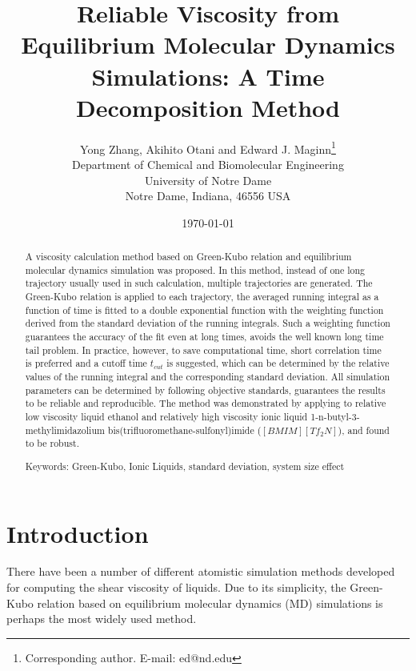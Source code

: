 \documentclass[12pt]{article}
\title{Reliable Viscosity from Equilibrium Molecular Dynamics Simulations: A Time Decomposition Method}
\author{Yong Zhang, Akihito Otani and Edward J. Maginn\thanks{Corresponding author. E-mail: ed@nd.edu} \\
                Department of Chemical and Biomolecular Engineering\\
                University of Notre Dame\\
                Notre Dame, Indiana, 46556 USA}
\date{\today}
\begin{document}

\maketitle

\newpage
\begin{abstract}

A viscosity calculation method based on Green-Kubo relation
and equilibrium molecular dynamics simulation was proposed.
In this method,
instead of one long trajectory usually used in such calculation,
multiple trajectories are generated.
The Green-Kubo relation is applied to each trajectory,
the averaged running integral as a function of time is fitted to a double exponential function
with the weighting function derived from the standard deviation of the running integrals.
Such a weighting function guarantees the accuracy of the fit even at long times,
avoids the well known long time tail problem.
In practice, however, to save computational time,
short correlation time is preferred and
a cutoff time $t_{cut}$ is suggested,
which can be determined by the relative values of the running integral and the corresponding standard deviation.
All simulation parameters can be determined by following objective standards,
guarantees the results to be reliable and reproducible.
The method was demonstrated by applying to relative low viscosity liquid ethanol and 
relatively high viscosity ionic liquid 1-n-butyl-3-methylimidazolium bis(trifluoromethane-sulfonyl)imide ($[BMIM][Tf_2N]$),
and found to be robust.
\newline

Keywords: Green-Kubo, Ionic Liquids, standard deviation, system size effect

\end{abstract}

\newpage
\section{Introduction}

There have been a number of different atomistic simulation methods developed for computing the shear viscosity of liquids.
\cite{ComputerSimulationOfLiquids,
Morriss.PRA.30.1528.1984,
Cummings.IECR.31.1237.1992,	%
Muller-Plathe.PRE.59.4894.1999,
Maginn.JCP.113.2079.2000,
Margulis.ACR.40.1097.2007,	%
Mu.JML.193.262.2014,		%
Hummer.JPCB.108.15873.2004,	%
Margulis.JPCB.111.4705.2007,	%
Maginn.JPCB.111.4867.2007,	%
Borodin.JPCB.113.4771.2009,	%
Mejia.JML.186.106.2013,		%
Atilhan.IECR.52.16774.2013,	%
Llovell.JPCB.117.8159.2013,	%
Lee.JPCB.118.2712.2014,		%
Yethiraj.JPCL.5.2670.2014	%
}
Due to its simplicity, 
the Green-Kubo relation based on equilibrium molecular dynamics (MD) simulations is perhaps the most widely used method.
\cite{ComputerSimulationOfLiquids}
\end{document}
